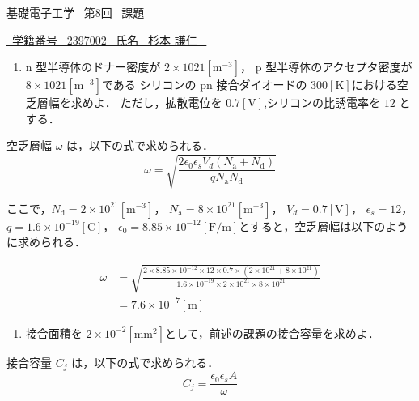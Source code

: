 \documentclass{classes/report}
\begin{document}
基礎電子工学 \ 第8回 \ 課題
\begin{flushright}
    \underline{\ 学籍番号 \ 2397002 \ 氏名 \ 杉本 謙仁 \ }
\end{flushright}

\bigskip

\begin{enumerate}
    \item n 型半導体のドナー密度が $2 \times 1021 [\mathrm{m}^{-3}]$，
          p 型半導体のアクセプタ密度が $8 \times 1021 [\mathrm{m}^{-3}]$である
          シリコンの pn 接合ダイオードの $300 [\mathrm{K}]$における空乏層幅を求めよ．
          ただし，拡散電位を $0.7 [\mathrm{V}]$,シリコンの比誘電率を $12$ とする．
\end{enumerate}

空乏層幅 $\omega$ は，以下の式で求められる．
\begin{equation}
    \omega = \sqrt{\frac{2\epsilon_0 \epsilon_s V_{d} \left( N_{\mathrm{a}} + N_{\mathrm{d}} \right)}{q N_{\mathrm{a}} N_{\mathrm{d}}}}
\end{equation}

ここで，$N_{\mathrm{d}} = 2 \times 10^{21} [\mathrm{m}^{-3}]$，
$N_{\mathrm{a}} = 8 \times 10^{21} [\mathrm{m}^{-3}]$，
$V_{d} = 0.7 [\mathrm{V}]$，
$\epsilon_s = 12$，
$q = 1.6 \times 10^{-19} [\mathrm{C}]$，
$\epsilon_0 = 8.85 \times 10^{-12} [\mathrm{F/m}]$とすると，空乏層幅は以下のように求められる．

\begin{equation}
    \begin{split}
        \omega &= \sqrt{\frac{2 \times 8.85 \times 10^{-12} \times 12 \times 0.7 \times \left( 2 \times 10^{21} + 8 \times 10^{21} \right)}{1.6 \times 10^{-19} \times 2 \times 10^{21} \times 8 \times 10^{21}}} \\
        &= 7.6 \times 10^{-7} [\mathrm{m}]
    \end{split}
\end{equation}

\bigskip

\begin{enumerate}[resume]
    \item 接合面積を $2 \times 10^{-2} [\mathrm{mm}^2]$として，前述の課題の接合容量を求めよ．
\end{enumerate}

接合容量 $C_{j}$ は，以下の式で求められる．
\begin{equation}
    C_{j} = \frac{\epsilon_0 \epsilon_s A}{\omega}
\end{equation}
\end{document}
